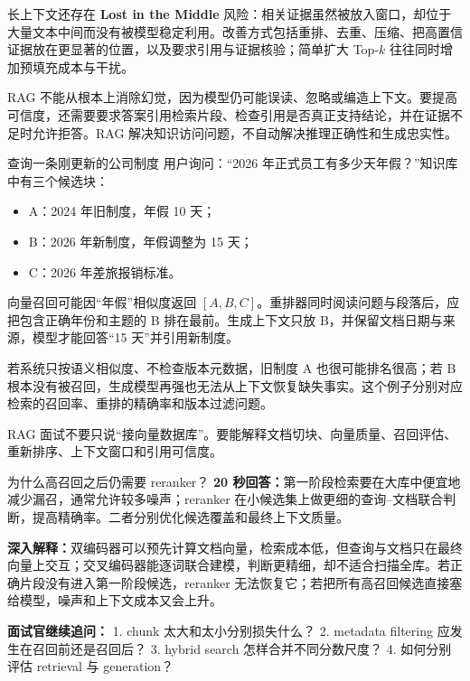 长上下文还存在 \textbf{Lost in the Middle} 风险：相关证据虽然被放入窗口，却位于大量文本中间而没有被模型稳定利用。改善方式包括重排、去重、压缩、把高置信证据放在更显著的位置，以及要求引用与证据核验；简单扩大 Top-$k$ 往往同时增加预填充成本与干扰。

RAG 不能从根本上消除幻觉，因为模型仍可能误读、忽略或编造上下文。要提高可信度，还需要要求答案引用检索片段、检查引用是否真正支持结论，并在证据不足时允许拒答。RAG 解决知识访问问题，不自动解决推理正确性和生成忠实性。

\begin{examplebox}{查询一条刚更新的公司制度}
用户询问：“2026 年正式员工有多少天年假？”知识库中有三个候选块：
\begin{itemize}
  \item A：2024 年旧制度，年假 10 天；
  \item B：2026 年新制度，年假调整为 15 天；
  \item C：2026 年差旅报销标准。
\end{itemize}
向量召回可能因“年假”相似度返回 $[A,B,C]$。重排器同时阅读问题与段落后，应把包含正确年份和主题的 B 排在最前。生成上下文只放 B，并保留文档日期与来源，模型才能回答“15 天”并引用新制度。

若系统只按语义相似度、不检查版本元数据，旧制度 A 也很可能排名很高；若 B 根本没有被召回，生成模型再强也无法从上下文恢复缺失事实。这个例子分别对应检索的召回率、重排的精确率和版本过滤问题。
\end{examplebox}

\begin{takeawaybox}
RAG 面试不要只说“接向量数据库”。要能解释文档切块、向量质量、召回评估、重新排序、上下文窗口和引用可信度。
\end{takeawaybox}

\begin{interviewbox}{为什么高召回之后仍需要 reranker？}
\textbf{20 秒回答：}第一阶段检索要在大库中便宜地减少漏召，通常允许较多噪声；reranker 在小候选集上做更细的查询--文档联合判断，提高精确率。二者分别优化候选覆盖和最终上下文质量。

\textbf{深入解释：}双编码器可以预先计算文档向量，检索成本低，但查询与文档只在最终向量上交互；交叉编码器能逐词联合建模，判断更精细，却不适合扫描全库。若正确片段没有进入第一阶段候选，reranker 无法恢复它；若把所有高召回候选直接塞给模型，噪声和上下文成本又会上升。

\textbf{面试官继续追问：}
1. chunk 太大和太小分别损失什么？
2. metadata filtering 应发生在召回前还是召回后？
3. hybrid search 怎样合并不同分数尺度？
4. 如何分别评估 retrieval 与 generation？
\end{interviewbox}

